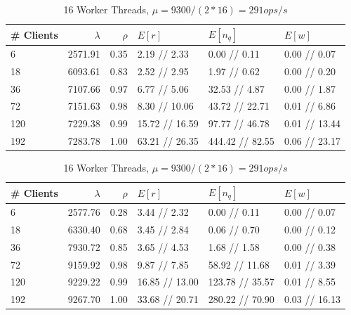 \documentclass[11pt,a4paper]{article}
\begin{document}
\begin{table}
    \begin{subtable}{1.0\linewidth}\centering
        \begin{tabular}{lrrlll}
        \hline
        \# Clients &  $\lambda$ &  $\rho$ &         $E[r]$ &        $E[n_q]$ &        $E[w]$ \\
        \hline
          6 &    2571.91 &    0.35 &    2.19 // 2.33 &     0.00 // 0.11 &   0.00 // 0.07 \\
         18 &    6093.61 &    0.83 &    2.52 // 2.95 &     1.97 // 0.62 &   0.00 // 0.20 \\
         36 &    7107.66 &    0.97 &    6.77 // 5.06 &    32.53 // 4.87 &   0.00 // 1.87 \\
         72 &    7151.63 &    0.98 &   8.30 // 10.06 &   43.72 // 22.71 &   0.01 // 6.86 \\
        120 &    7229.38 &    0.99 &  15.72 // 16.59 &   97.77 // 46.78 &  0.01 // 13.44 \\
        192 &    7283.78 &    1.00 &  63.21 // 26.35 &  444.42 // 82.55 &  0.06 // 23.17 \\
        \hline
        \end{tabular}
        \caption{8 Worker Threads, $\mu = 7300 / (2*8) = 456 ops/s$}
    \end{subtable}
    \begin{subtable}{1.0\linewidth}\centering
        \begin{tabular}{lrrlll}
        \hline
        \# Clients &  $\lambda$ &  $\rho$ &         $E[r]$ &        $E[n_q]$ &        $E[w]$ \\
        \hline
          6 &    2577.76 &    0.28 &    3.44 // 2.32 &     0.00 // 0.11 &   0.00 // 0.07 \\
         18 &    6330.40 &    0.68 &    3.45 // 2.84 &     0.06 // 0.70 &   0.00 // 0.12 \\
         36 &    7930.72 &    0.85 &    3.65 // 4.53 &     1.68 // 1.58 &   0.00 // 0.38 \\
         72 &    9159.92 &    0.98 &    9.87 // 7.85 &   58.92 // 11.68 &   0.01 // 3.39 \\
        120 &    9229.22 &    0.99 &  16.85 // 13.00 &  123.78 // 35.57 &   0.01 // 8.55 \\
        192 &    9267.70 &    1.00 &  33.68 // 20.71 &  280.22 // 70.90 &  0.03 // 16.13 \\
        \hline
        \end{tabular}
        \caption{16 Worker Threads, $\mu = 9300 / (2*16) = 291 ops/s$}
    \end{subtable}
    

\end{table}
\end{document}
